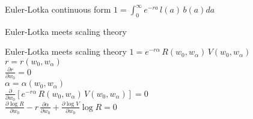 \documentclass{beamer}
\begin{document}
\begin{frame}{Euler-Lotka continuous form}
  $1 = \int_{0}^{\infty} e^{-ra} \, l(a) \, b(a) da$\\
\end{frame}

\begin{frame}{Euler-Lotka meets scaling theory}
\end{frame}

{
  
}

\begin{frame}{Euler-Lotka meets scaling theory}
  $1 = e^{-r \alpha} \, R(w_0,w_{\alpha}) \, V(w_0,w_{\alpha})$\\
  \vspace{.5cm}
  \pause
  $r = r(w_0,w_{\alpha})$\\
  \vspace{.5cm}
  \pause
  $\frac{\partial r}{\partial w_0} = 0$\\
  \vspace{.5cm}
  \pause
  $\alpha = \alpha(w_0,w_{\alpha})$\\
  \vspace{.5cm}
  \pause
  $\frac{\partial}{\partial w_0} \left[ e^{-r \alpha} \, R(w_0,w_{\alpha}) \, V(w_0,w_{\alpha}) \right] = 0$\\
  \vspace{.5cm}
  \pause
  $\frac{\partial \log{R}}{\partial w_0} - r \, \frac{\partial \alpha}{\partial w_0} + \frac{\partial \log{V}}{\partial w_0} \log{R} = 0$\\
\end{frame}

{
  
}

\end{document}
